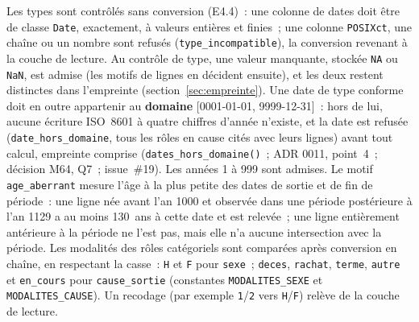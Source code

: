 \documentclass[a4paper,11pt]{article}
\newcommand{\code}[1]{\texttt{\small #1}}
\begin{document}
\noindent
Les types sont contrôlés sans conversion (E4.4)~: une colonne de dates doit
être de classe \code{Date}, exactement, à valeurs entières et finies~; une
colonne \code{POSIXct}, une chaîne ou un nombre sont refusés
(\code{type\_incompatible}), la conversion revenant à la couche de lecture.
Au contrôle de type, une valeur manquante, stockée \code{NA} ou \code{NaN},
est admise (les motifs de lignes en décident ensuite), et les deux restent
distinctes dans l'empreinte (section~\ref{sec:empreinte}). Une
date de type conforme doit en outre appartenir au \textbf{domaine}
[0001-01-01, 9999-12-31]~: hors de lui, aucune écriture ISO~8601 à quatre
chiffres d'année n'existe, et la date est refusée
(\code{date\_hors\_domaine}, tous les rôles en cause cités avec leurs
lignes) avant tout calcul, empreinte comprise (\code{dates\_hors\_domaine()}~;
ADR 0011, point~4~; décision M64, Q7~; issue~\#19). Les années 1 à 999 sont
admises. Le motif \code{age\_aberrant} mesure l'âge à la plus petite des
dates de sortie et de fin de période~: une ligne née avant l'an 1000 et
observée dans une période postérieure à l'an 1129 a au moins 130~ans à cette
date et est relevée~; une ligne entièrement antérieure à la période ne l'est
pas, mais elle n'a aucune intersection avec la période.
Les modalités des rôles catégoriels sont comparées après conversion en
chaîne, en respectant la casse~: \code{H} et \code{F} pour \code{sexe}~;
\code{deces}, \code{rachat}, \code{terme}, \code{autre} et \code{en\_cours}
pour \code{cause\_sortie} (constantes \code{MODALITES\_SEXE} et
\code{MODALITES\_CAUSE}). Un recodage (par exemple \code{1}/\code{2} vers
\code{H}/\code{F}) relève de la couche de lecture.
\end{document}

